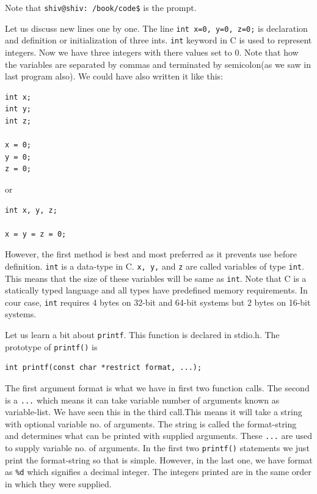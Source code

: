 Note that \texttt{shiv@shiv:~/book/code\$} is the prompt.

Let us discuss new lines one by one. The line \texttt{int x=0, y=0, z=0;} is
declaration and definition or initialization of three ints. \texttt{int}
keyword in C is used to represent integers. Now we have three integers with
there values set to 0. Note that how the variables are separated by commas and
terminated by semicolon(as we saw in last program also). We could have also
written it like this:

\begin{verbatim}
int x;
int y;
int z;

x = 0;
y = 0;
z = 0;
\end{verbatim}

or

\begin{verbatim}
int x, y, z;

x = y = z = 0;
\end{verbatim}

However, the first method is best and most preferred as it prevents use before
definition. \texttt{int} is a data-type in C. \texttt{x, y,} and \texttt{z} are
called variables of type \texttt{int}. This means that the size of these
variables will be same as \texttt{int}. Note that 
C is a statically typed language and all types have predefined memory
requirements. In cour case, \texttt{int} requires 4 bytes on 32-bit and 64-bit
systems but 2 bytes on 16-bit systems.

Let us learn a bit about \texttt{printf}. This function is declared in
stdio.h. The prototype of \texttt{printf()} is

\begin{verbatim}
int printf(const char *restrict format, ...);
\end{verbatim}

The first argument format is what we have in first two function calls. The
second is a \texttt{...} which means it can take variable number of arguments
known as variable-list. We have seen this in the third call.This means it will
take a string with optional variable no. of arguments. The string is called the
format-string and determines what can be printed with supplied arguments. These
\texttt{...} are used to supply variable no. of arguments. In the first two
\texttt{printf()} statements we just print the format-string so that is
simple. However, in the last one, we have format as \texttt{\%d} which
signifies a decimal integer. The integers printed are in the same order in
which they were supplied.

